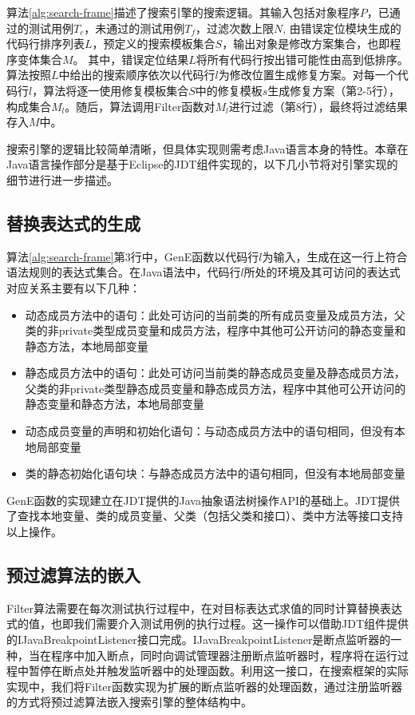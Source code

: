 算法\ref{alg:search-frame}描述了搜索引擎的搜索逻辑。其输入包括对象程序$P$，已通过的测试用例$T_c$，未通过的测试用例$T_f$，过滤次数上限$N$, 由错误定位模块生成的代码行排序列表$L$，预定义的搜索模板集合$S$，输出对象是修改方案集合，也即程序变体集合$M$。
其中，错误定位结果$L$将所有代码行按出错可能性由高到低排序。算法按照$L$中给出的搜索顺序依次以代码行$l$为修改位置生成修复方案。对每一个代码行$l$，算法将逐一使用修复模板集合$S$中的修复模板$s$生成修复方案（第2-5行），构成集合$M_l$。随后，算法调用Filter函数对$M_l$进行过滤（第8行），最终将过滤结果存入$M$中。

搜索引擎的逻辑比较简单清晰，但具体实现则需考虑Java语言本身的特性。本章在Java语言操作部分是基于Eclipse的JDT组件\cite{eclipse:jdt}实现的，以下几小节将对引擎实现的细节进行进一步描述。

\subsection{替换表达式的生成}
算法\ref{alg:search-frame}第3行中，GenE函数以代码行$l$为输入，生成在这一行上符合语法规则的表达式集合。在Java语法中，代码行$l$所处的环境及其可访问的表达式对应关系主要有以下几种：
\begin{itemize}
	\item 动态成员方法中的语句：此处可访问的当前类的所有成员变量及成员方法，父类的非private类型成员变量和成员方法，程序中其他可公开访问的静态变量和静态方法，本地局部变量
	\item 静态成员方法中的语句：此处可访问当前类的静态成员变量及静态成员方法，父类的非private类型静态成员变量和静态成员方法，程序中其他可公开访问的静态变量和静态方法，本地局部变量
	\item 动态成员变量的声明和初始化语句：与动态成员方法中的语句相同，但没有本地局部变量
	\item 类的静态初始化语句块：与静态成员方法中的语句相同，但没有本地局部变量
\end{itemize}

GenE函数的实现建立在JDT提供的Java抽象语法树操作API的基础上。JDT提供了查找本地变量、类的成员变量、父类（包括父类和接口）、类中方法等接口支持以上操作。

\subsection{预过滤算法的嵌入}

Filter算法需要在每次测试执行过程中，在对目标表达式求值的同时计算替换表达式的值，也即我们需要介入测试用例的执行过程。这一操作可以借助JDT组件提供的IJavaBreakpointListener接口完成。IJavaBreakpointListener是断点监听器的一种，当在程序中加入断点，同时向调试管理器注册断点监听器时，程序将在运行过程中暂停在断点处并触发监听器中的处理函数。利用这一接口，在搜索框架的实际实现中，我们将Filter函数实现为扩展的断点监听器的处理函数，通过注册监听器的方式将预过滤算法嵌入搜索引擎的整体结构中。

